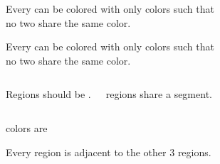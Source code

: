 
\begin{frame}
\end{frame}

\begin{frame}{}
  \begin{theorem}
    Every  can be colored with only  colors such that \\
    no two   share the same color.
  \end{theorem}

  \pause
\end{frame}

\begin{frame}{}
  \begin{theorem}
    Every  can be colored with only  colors such that \\
    no two   share the same color.
  \end{theorem}

  \begin{columns}
      \pause
        \begin{center}
          {Regions should be .}
        \end{center}
      \pause
      \begin{center}
         regions share a segment.
      \end{center}
  \end{columns}
\end{frame}

\begin{frame}{}
\end{frame}

\begin{frame}{}
  \begin{center}
     colors are 

    \pause

    Every region is adjacent to the other $3$ regions.
  \end{center}
\end{frame}

